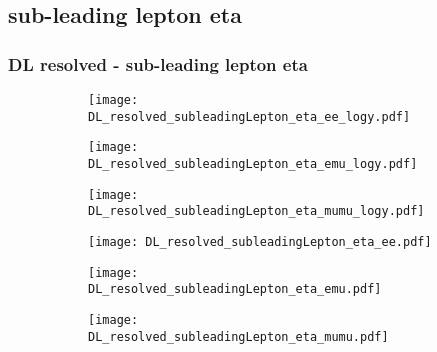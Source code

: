 \documentclass[aspectratio=169,8pt]{beamer}
\begin{document}
\subsection{sub-leading lepton eta}
\begin{frame}
\frametitle{DL resolved - sub-leading lepton eta}
\begin{figure}
\captionsetup[subfigure]{labelformat=empty}
\begin{subfigure}{0.32\textwidth}
\texttt{[image: DL\_resolved\_subleadingLepton\_eta\_ee\_logy.pdf]}
\vspace*{-0.15cm}
\end{subfigure}
\hfil
\begin{subfigure}{0.32\textwidth}
\texttt{[image: DL\_resolved\_subleadingLepton\_eta\_emu\_logy.pdf]}
\vspace*{-0.15cm}
\end{subfigure}
\hfil
\begin{subfigure}{0.32\textwidth}
\texttt{[image: DL\_resolved\_subleadingLepton\_eta\_mumu\_logy.pdf]}
\vspace*{-0.15cm}
\end{subfigure}
\hfil
\begin{subfigure}{0.32\textwidth}
\texttt{[image: DL\_resolved\_subleadingLepton\_eta\_ee.pdf]}
\vspace*{-0.15cm}
\end{subfigure}
\hfil
\begin{subfigure}{0.32\textwidth}
\texttt{[image: DL\_resolved\_subleadingLepton\_eta\_emu.pdf]}
\vspace*{-0.15cm}
\end{subfigure}
\hfil
\begin{subfigure}{0.32\textwidth}
\texttt{[image: DL\_resolved\_subleadingLepton\_eta\_mumu.pdf]}
\vspace*{-0.15cm}
\end{subfigure}
\hfil
\end{figure}
\end{frame}
\newpage
\end{document}
